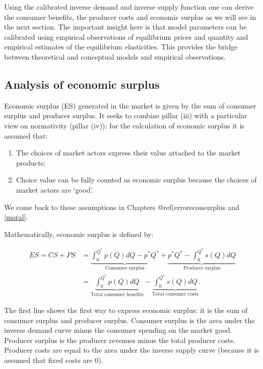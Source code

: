 \documentclass[
]{book}
\providecommand{\tightlist}{%
  \setlength{\itemsep}{0pt}\setlength{\parskip}{0pt}}
\begin{document}
Using the calibrated inverse demand and inverse supply function one can derive the consumer benefits, the producer costs and economic surplus as we will see in the next section. The important insight here is that model parameters can be calibrated using empirical observations of equilibrium prices and quantity and empirical estimates of the equilibrium elasticities. This provides the bridge between theoretical and conceptual models and empirical observations.

\hypertarget{analysis-of-economic-surplus}{%
\subsection{Analysis of economic surplus}\label{analysis-of-economic-surplus}}

Economic surplus (ES) generated in the market is given by the sum of consumer surplus and producer surplus. It seeks to combine pillar (iii) with a particular view on normativity (pillar (iv)): for the calculation of economic surplus it is assumed that:

\begin{enumerate}
\def\labelenumi{\arabic{enumi}.}
\tightlist
\item
  The choices of market actors express their value attached to the market products;
\item
  Choice value can be fully counted as economic surplus because the choices of market actors are `good'.
\end{enumerate}

We come back to these assumptions in Chapters @ref(erroreconsurplus and \ref{moral}.

Mathematically, economic surplus is defined by:

\begin{align}
ES = CS + PS &= \underbrace{\int_0^{Q^\ast} p(Q)dQ - p^\ast Q^\ast}_\text{Consumer surplus} + \underbrace{p^\ast Q^\ast - \int^{Q^\ast}_0 s(Q)dQ}_\text{Producer surplus}\\
&= \underbrace{\int_0^{Q^\ast} p(Q)dQ}_\text{Total consumer benefits} - \underbrace{\int^{Q^\ast}_0 s(Q)dQ}_\text{Total consumer costs}.
\end{align}

The first line shows the first way to express economic surplus: it is the sum of consumer surplus and producer surplus. Consumer surplus is the area under the inverse demand curve minus the consumer spending on the market good. Producer surplus is the producer revenues minus the total producer costs. Producer costs are equal to the area under the inverse supply curve (because it is assumed that fixed costs are 0).
\end{document}
